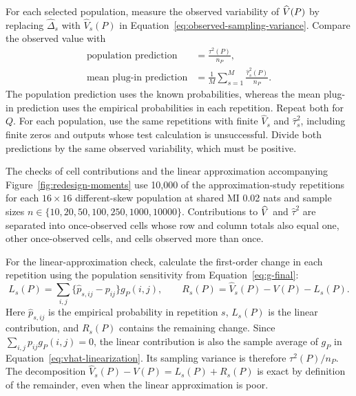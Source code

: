 For each selected population, measure the observed variability of
\(\widehat V(P)\) by replacing \(\widehat\Delta_s\) with
\(\widehat V_s(P)\) in Equation~\eqref{eq:observed-sampling-variance}.
Compare the observed value with
\begin{equation}
\begin{aligned}
 \text{population prediction}&=\frac{\tau^2(P)}{n_P},\\
 \text{mean plug-in prediction}&=
 \frac{1}{M}\sum_{s=1}^{M}\frac{\widehat\tau_s^2(P)}{n_P}.
\end{aligned}
 \label{eq:variance-stability-predictions}
\end{equation}
The population prediction uses the known probabilities, whereas the mean
plug-in prediction uses the empirical probabilities in each repetition.
Repeat both for \(Q\). For each population, use the same repetitions with finite
\(\widehat V_s\) and \(\widehat\tau_s^2\), including finite zeros
and outputs whose test calculation is unsuccessful. Divide both predictions
by the same observed variability, which must be positive.

The checks of cell contributions and the linear approximation accompanying
Figure~\ref{fig:redesign-moments} use 10,000 of the approximation-study
repetitions for each \(16\times16\) different-skew population at shared
MI 0.02 nats and sample sizes
\(n\in\{10,20,50,100,250,1000,10000\}\).
Contributions to \(\widehat V\) and \(\widehat\tau^2\) are separated into
once-observed cells whose row and column totals also equal one, other
once-observed cells, and cells observed more than once.

For the linear-approximation check, calculate the first-order change in
each repetition using the population sensitivity from
Equation~\eqref{eq:g-final}:
\begin{equation}
 L_s(P)=\sum_{i,j}\{\widehat p_{s,ij}-p_{ij}\}g_P(i,j),
 \qquad
 R_s(P)=\widehat V_s(P)-V(P)-L_s(P).
 \label{eq:variance-linear-remainder}
\end{equation}
Here \(\widehat p_{s,ij}\) is the empirical probability in repetition
\(s\), \(L_s(P)\) is the linear contribution, and \(R_s(P)\) contains
the remaining change. Since \(\sum_{i,j}p_{ij}g_P(i,j)=0\), the linear
contribution is also the sample average of \(g_P\) in
Equation~\eqref{eq:vhat-linearization}. Its sampling variance is therefore
\(\tau^2(P)/n_P\). The decomposition
\(\widehat V_s(P)-V(P)=L_s(P)+R_s(P)\) is exact by definition of the
remainder, even when the linear approximation is poor.

